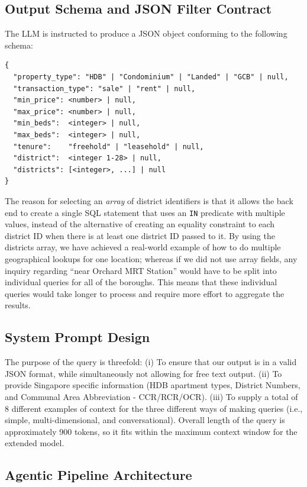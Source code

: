\subsection{Output Schema and JSON Filter Contract}

The LLM is instructed to produce a JSON object conforming to the following schema:

\begin{verbatim}
{
  "property_type": "HDB" | "Condominium" | "Landed" | "GCB" | null,
  "transaction_type": "sale" | "rent" | null,
  "min_price": <number> | null,
  "max_price": <number> | null,
  "min_beds":  <integer> | null,
  "max_beds":  <integer> | null,
  "tenure":    "freehold" | "leasehold" | null,
  "district":  <integer 1-28> | null,
  "districts": [<integer>, ...] | null
}
\end{verbatim}

The reason for selecting an \emph{array} of district identifiers is that it 
allows the back end to create a single SQL statement that uses an \texttt{IN} 
predicate with multiple values, instead of the alternative of creating an 
equality constraint to each district ID when there is at least one district ID 
passed to it. By using the districts array, we have achieved a real-world 
example of how to do multiple geographical lookups for one location; whereas 
if we did not use array fields, any inquiry regarding ``near Orchard MRT 
Station'' would have to be split into individual queries for all of the 
boroughs. This means that these individual queries would take longer to 
process and require more effort to aggregate the results.

\subsection{System Prompt Design}

The purpose of the query is threefold: (i) To ensure that our output is in a valid JSON format, while simultaneously not allowing for free text output. (ii) To provide Singapore specific information (HDB apartment types, District Numbers, and Communal Area Abbreviation - CCR/RCR/OCR). (iii) To supply a total of 8 different examples of context for the three different ways of making queries (i.e., simple, multi-dimensional, and conversational). Overall length of the query is approximately 900 tokens, so it fits within the maximum context window for the extended model.

\subsection{Agentic Pipeline Architecture}

